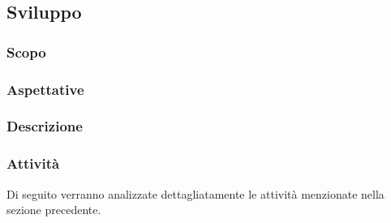 \subsection{Sviluppo}
		\subsubsection{Scopo}

		\subsubsection{Aspettative}

		\subsubsection{Descrizione}

		\subsubsection{Attività}

			Di seguito verranno analizzate dettagliatamente le attività menzionate nella sezione precedente.
